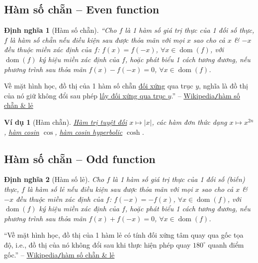 \documentclass[oneside]{book}
\numberwithin{equation}{section}
\newtheorem{dinhnghia}{Định nghĩa}[section]
\newtheorem{vidu}{Ví dụ}[section]
\begin{document}
\subsection{Hàm số chẵn -- Even function}

\begin{dinhnghia}[Hàm số chẵn]
	``Cho $f$ là 1 hàm số giá trị thực của 1 đối số thực, $f$ là \emph{hàm số chẵn} nếu điều kiện sau được thỏa mãn với mọi $x$ sao cho cả $x$ \& $-x$ đều thuộc miền xác định của $f$: $f(x) = f(-x)$, $\forall x\in\operatorname{dom}(f)$, với $\operatorname{dom}(f)$ ký hiệu miền xác định của $f$, hoặc phát biểu 1 cách tương đương, nếu phương trình sau thỏa mãn $f(x) - f(-x) = 0$, $\forall x\in\operatorname{dom}(f)$.
\end{dinhnghia}
Về mặt hình học, đồ thị của 1 hàm số chẵn \href{https://vi.wikipedia.org/wiki/%C4%90%E1%BB%91i_x%E1%BB%A9ng}{đối xứng} qua trục $y$, nghĩa là đồ thị của nó giữ không đổi sau phép \href{https://vi.wikipedia.org/wiki/%C4%90%E1%BB%91i_x%E1%BB%A9ng_tr%E1%BB%A5c}{lấy đối xứng qua trục $y$}.'' -- \href{https://vi.wikipedia.org/wiki/H%C3%A0m_s%E1%BB%91_ch%E1%BA%B5n_v%C3%A0_l%E1%BA%BB}{Wikipedia\texttt{/}hàm số chẵn \& lẻ}

\begin{vidu}[Hàm chẵn]
	\href{https://vi.wikipedia.org/wiki/Gi%C3%A1_tr%E1%BB%8B_tuy%E1%BB%87t_%C4%91%E1%BB%91i}{Hàm trị tuyệt đối} $x\mapsto|x|$, các hàm đơn thức dạng $x\mapsto x^{2n}$, \href{https://vi.wikipedia.org/wiki/H%C3%A0m_l%C6%B0%E1%BB%A3ng_gi%C3%A1c}{hàm cosin} $\cos$, \href{https://vi.wikipedia.org/wiki/H%C3%A0m_hyperbolic}{hàm cosin hyperbolic} $\cosh$.
\end{vidu}

\subsection{Hàm số chẵn -- Odd function}

\begin{dinhnghia}[Hàm số lẻ]
	Cho $f$ là 1 hàm số giá trị thực của 1 đối số (biến) thực, $f$ là hàm số \emph{lẻ} nếu điều kiện sau được thỏa mãn với mọi $x$ sao cho cả $x$ \& $-x$ đều thuộc miền xác định của $f$: $f(-x) = -f(x)$, $\forall x\in\operatorname{dom}(f)$, với $\operatorname{dom}(f)$ ký hiệu miền xác định của $f$, hoặc phát biểu 1 cách tương đương, nếu phương trình sau thỏa mãn $f(x) + f(-x) = 0$, $\forall x\in\operatorname{dom}(f)$.
\end{dinhnghia}
``Về mặt hình học, đồ thị của 1 hàm lẻ có tính đối xứng tâm quay qua gốc tọa độ, i.e., đồ thị của nó không đổi sau khi thực hiện phép quay $180^\circ$ quanh điểm gốc.'' -- \href{https://vi.wikipedia.org/wiki/H%C3%A0m_s%E1%BB%91_ch%E1%BA%B5n_v%C3%A0_l%E1%BA%BB}{Wikipedia\texttt{/}hàm số chẵn \& lẻ}
\end{document}
